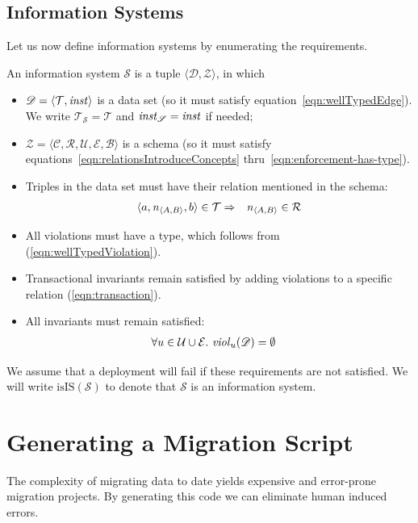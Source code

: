 \documentclass[runningheads]{llncs}
\newcommand{\id}[1]{\text{\it #1\/}}
\newcommand{\instance}{\mathbin{\id{inst}}}
\newcommand{\viol}[2]{\violC{#1}(#2)}
\newcommand{\violC}[1]{\id{viol}_{#1}}
\newcommand{\declare}[3]{\id{#1}_{\pair{#2}{#3}}}
\newcommand{\pair}[2]{\langle{#1},{#2}\rangle}
\newcommand{\triple}[3]{\langle{#1},{#2},{#3}\rangle}
\newcommand{\quintuple}[5]{\langle{#1},{#2},{#3},{#4},{#5}\rangle}
\newcommand{\concepts}{\mathcal{C}}
\newcommand{\rels}{\mathcal{R}}   %
\newcommand{\triples}{\mathcal{T}}
\newcommand{\rules}{\mathcal{U}}
\newcommand{\transactions}{\mathcal{E}}
\newcommand{\busConstraints}{\mathcal{B}}
\newcommand{\dataset}{\mathscr{D}}
\newcommand{\schema}{\mathscr{Z}}
\newcommand{\infsys}{\mathscr{S}}
\begin{document}
\subsection{Information Systems}
\label{sct:Information Systems}
   Let us now define information systems by enumerating the requirements.
\begin{definition}
\label{def:information system}
\item An information system $\infsys$ is a tuple $\pair{\dataset}{\schema}$, in which
\begin{itemize}
\item $\dataset=\pair{\triples}{\instance}$ is a data set (so it must satisfy equation~\ref{eqn:wellTypedEdge}).
   We write $\triples_\infsys = \triples$ and $\instance_\infsys = \instance$ if needed;
\item $\schema=\quintuple{\concepts}{\rels}{\rules}{\transactions}{\busConstraints}$ is a schema (so it must satisfy equations~\ref{eqn:relationsIntroduceConcepts} thru~\ref{eqn:enforcement-has-type}).
\item Triples in the data set must have their relation mentioned in the schema:
   \begin{eqnarray}
      \triple{a}{\declare{n}{A}{B}}{b}\in\triples&\Rightarrow&\declare{n}{A}{B}\in\rels
   \label{eqn:define R}
   \end{eqnarray}
\item All violations must have a type, which follows from  (\ref{eqn:wellTypedViolation}).
\item Transactional invariants remain satisfied by adding violations to a specific relation (\ref{eqn:transaction}).
\item All invariants must remain satisfied:
   \begin{align}
      \forall u\in\rules\cup\transactions&.~\viol{u}{\dataset}=\emptyset
   \label{eqn:satisfaction}
   \end{align}
\end{itemize}
\end{definition}
   We assume that a deployment will fail if these requirements are not satisfied.
   We will write $\text{isIS}(\infsys)$ to denote that $\infsys$ is an information system.

\section{Generating a Migration Script}
\label{sct:Generating}
   The complexity of migrating data to date yields expensive and error-prone migration projects.
   By generating this code we can eliminate human induced errors.
   
\end{document}
